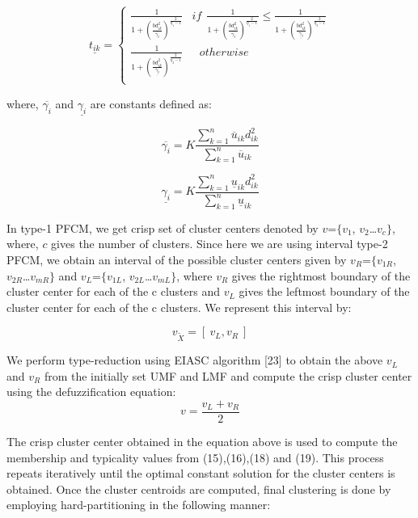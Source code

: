 \documentclass[journal, onecolumn]{IEEEtran}
\begin{document}
\begin{equation}
 \underline{t_{ik}} =
  \begin{cases}
               \frac{1}{1+ (\frac{b d_{ik}^2}{\overline{\gamma_i}})^{\frac{2}{\eta_1-1}}}                     & if \:\: \frac{1}{1+ (\frac{b d_{ik}^2}{\overline{\gamma_i}})^{\frac{2}{\eta_1-1}}} \leq \frac{1}{1+ (\frac{ b d_{ik}^2}{\underline{\gamma_i}})^{\frac{2}{\eta_2-1}}} \\
 \frac{1}{1+ (\frac{b d_{ik}^2}{\underline{\gamma_i}})^{\frac{2}{\eta_2-1}}}  &\:\:\:otherwise \\
 
  \end{cases}
\end{equation}

where, $\overline{\gamma_i}$ and $\underline{\gamma_i}$ are constants defined as: 


\begin{equation}
\overline{\gamma_i}= K \frac{\sum_{k=1}^n \overline{u}_{ik} d_{ik}^2}{\sum_{k=1}^n \overline{u}_{ik}}
\end{equation}

\begin{equation}
\underline{\gamma_i}= K \frac{\sum_{k=1}^n \underline{u}_{ik} d_{ik}^2}{\sum_{k=1}^n \underline{u}_{ik}}
\end{equation}


In type-1 PFCM, we get crisp set of cluster centers denoted by $v$=$\{$$v_1$, $v_2$…$v_c$$\}$, where, $c$ gives the number of clusters. Since here we are using interval type-2 PFCM, we obtain an interval of the possible cluster centers given by $v_R$=$\{$$v_{1R}$, $v_{2R}$…$v_{mR}$$\}$ and $v_L$=$\{$$v_{1L}$, $v_{2L}$…$v_{mL}$$\}$,  where $v_R$  gives the rightmost boundary of the cluster center for each of the c clusters and $v_L$ gives the leftmost boundary of the cluster center for each of the c clusters. We represent this interval by: 

\begin{equation}
v_{\tilde{X}}= [\: v_L, v_R\:]
\end{equation}

We perform type-reduction using EIASC algorithm [23] to obtain the above $v_L$ and $v_R$ from the initially set UMF and LMF and compute the crisp cluster center using the defuzzification equation: 
\begin{equation}
v=  \frac{v_L+ v_R}{2}
\end{equation}

The crisp cluster center obtained in the equation above is used to compute the membership and typicality values from (15),(16),(18) and (19). This process repeats iteratively until the optimal constant solution for the cluster centers is obtained. 
Once the cluster centroids are computed, final clustering is done by employing hard-partitioning in the following manner: 
\end{document}
